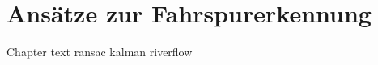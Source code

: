 \chapter{Ansätze zur Fahrspurerkennung}
\label{cha:fahrspurerkennung}
Chapter text
{ransac}
{kalman}
{riverflow}
